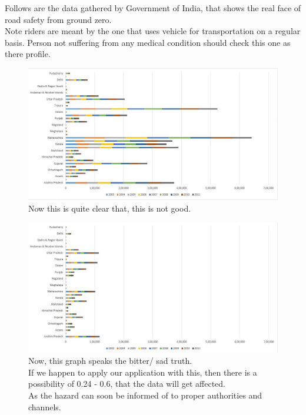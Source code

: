 Follows are the data gathered by Government of India, that shows the real face of road safety from ground zero. \\
Note riders are meant by the one that uses vehicle for transportation on a regular basis. Person not suffering from any medical condition should check this one as there profile.


\begin{figure}[h]
	\centering
	\includegraphics[height=0.35\textheight]{fig01/g_gov_acc}
	\label{fig:RHP01}
Now this is quite clear that, this is not good.
\end{figure}




\begin{figure}[h]
{	\centering
	\includegraphics[height=0.35\textheight]{fig01/g_gov_dead}
	\label{fig:RHP01}
}
Now, this graph speaks the bitter/ sad truth. \\
If we happen to apply our application with this, then there is a possibility of 0.24 - 0.6, that the data will get affected. \\
As the hazard can soon be informed of to proper authorities and channels.

\end{figure}

